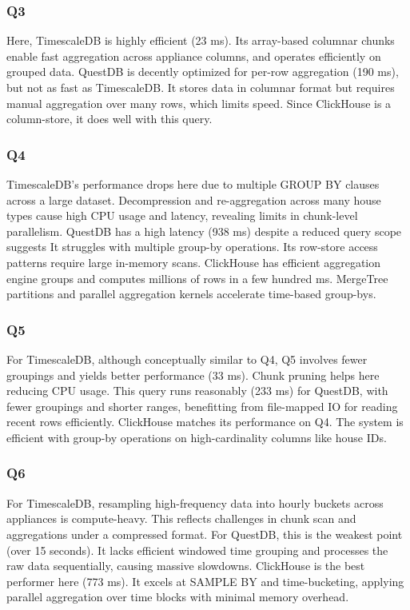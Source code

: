 \documentclass[conference]{IEEEtran}
\begin{document}
\subsubsection{Q3}
Here, TimescaleDB is highly efficient (23 ms). Its array-based columnar chunks enable fast aggregation across appliance columns, and operates efficiently on grouped data.
QuestDB is decently optimized for per-row aggregation (190 ms), but not as fast as TimescaleDB\@. It stores data in columnar format but requires manual aggregation over many rows, which limits speed.
Since ClickHouse is a column-store, it does well with this query.

\subsubsection{Q4}
TimescaleDB's performance drops here due to multiple GROUP BY clauses across a large dataset. Decompression and re-aggregation across many house types cause high CPU usage and latency, revealing limits in chunk-level parallelism.
QuestDB has a high latency (938 ms) despite a reduced query scope suggests It struggles with multiple group-by operations. Its row-store access patterns require large in-memory scans.
ClickHouse has efficient aggregation engine groups and computes millions of rows in a few hundred ms. MergeTree partitions and parallel aggregation kernels accelerate time-based group-bys.

\subsubsection{Q5}

For TimescaleDB, although conceptually similar to Q4, Q5 involves fewer groupings and yields better performance (33 ms). Chunk pruning helps here reducing CPU usage.
This query runs reasonably (233 ms) for QuestDB, with fewer groupings and shorter ranges, benefitting from file-mapped IO for reading recent rows efficiently.
ClickHouse matches its performance on Q4. The system is efficient with group-by operations on high-cardinality columns like house IDs.

\subsubsection{Q6}
For TimescaleDB, resampling high-frequency data into hourly buckets across appliances is compute-heavy. This reflects challenges in chunk scan and aggregations under a compressed format.
For QuestDB, this is the weakest point (over 15 seconds). It lacks efficient windowed time grouping and processes the raw data sequentially, causing massive slowdowns.
ClickHouse is the best performer here (773 ms). It excels at SAMPLE BY and time-bucketing, applying parallel aggregation over time blocks with minimal memory overhead.
\end{document}
